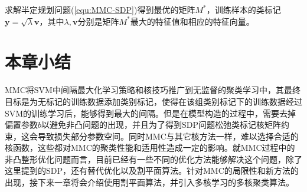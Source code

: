 求解半定规划问题(\ref{equ:MMC-SDP})得到最优的矩阵$M^*$，训练样本的类标记$\mathbf{y}=\sqrt{\mathit{\lambda}}\mathbf{v}$，其中$\mathit{\lambda},\mathbf{v}$分别是矩阵$M^*$最大的特征值和相应的特征向量。

\section{本章小结}
MMC将SVM中间隔最大化学习策略和核技巧推广到无监督的聚类学习中，其最终目标是为无标记的训练数据添加类别标记，使得在该组类别标记下的训练数据经过SVM的训练学习后，能够得到最大的间隔。但是在模型构造的过程中，需要去掉偏置参数$b$以避免非凸问题的出现，并且为了得到SDP问题松弛类标记核矩阵约束，这会导致损失部分参数空间。同时MMC与其它核方法一样，难以选择合适的核函数，这些都对MMC的聚类性能和适用性造成一定的影响。就MMC过程中的非凸整形优化问题而言，目前已经有一些不同的优化方法能够解决这个问题，除了这里提到的SDP，还有替代优化以及割平面算法。针对MMC的局限性和新方法的出现，接下来一章将会介绍使用割平面算法，并引入多核学习的多核聚类算法。